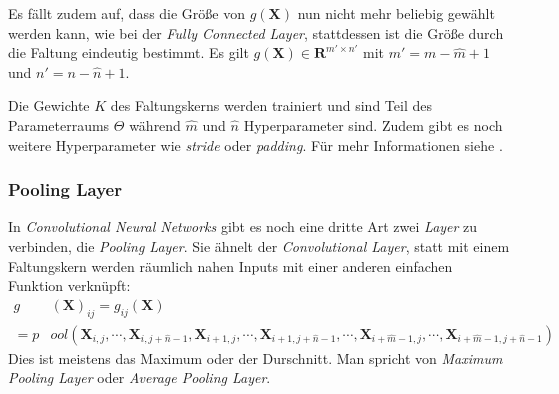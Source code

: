\documentclass[]{scrartcl}
\newcommand{\R}{\mathbf{R}}
\begin{document}
			Es fällt zudem auf, dass die Größe von $g(\mathbf{X})$ nun nicht mehr beliebig gewählt werden kann, wie bei der \textit{Fully Connected Layer}, stattdessen ist die Größe durch die Faltung
			eindeutig bestimmt. Es gilt $g(\mathbf{X}) \in \R^{m' \times n'}$ mit $m' = m - \hat{m} + 1$ und $n' = n - \hat{n} + 1$.

			Die Gewichte $K$ des Faltungskerns werden trainiert und sind Teil des Parameterraums $\Theta$ während $\hat{m}$ und $\hat{n}$ Hyperparameter sind.
			Zudem gibt es noch weitere Hyperparameter wie \textit{stride} oder \textit{padding}. Für mehr Informationen siehe \cite{convo}.

		\subsubsection{Pooling Layer}
			In \textit{Convolutional Neural Networks} gibt es noch eine dritte Art zwei \textit{Layer} zu verbinden, die \textit{Pooling Layer}.
			Sie ähnelt der \textit{Convolutional Layer}, statt mit einem Faltungskern werden räumlich nahen Inputs mit einer anderen
			einfachen Funktion verknüpft:
			\begin{align*}
				g&(\mathbf{X})_{ij} = g_{ij}(\mathbf{X}) \\
				= p&ool(\mathbf{X}_{i, j}, \cdots, \mathbf{X}_{i, j + \hat{n} - 1}, \mathbf{X}_{i + 1, j}, \cdots, \mathbf{X}_{i + 1, j + \hat{n} - 1},
				   \cdots, \mathbf{X}_{i + \hat{m} - 1, j}, \cdots, \mathbf{X}_{i + \hat{m} - 1, j + \hat{n} - 1})
			\end{align*}
			Dies ist meistens das Maximum oder der Durschnitt. Man spricht von \textit{Maximum Pooling Layer} oder \textit{Average Pooling Layer}.
\end{document}
